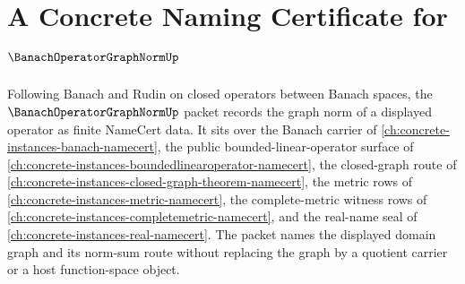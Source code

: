 \chapter{A Concrete Naming Certificate for $\BanachOperatorGraphNormUp$}
\label{ch:concrete-instances-banach-operator-graph-norm-namecert}

Following Banach and Rudin on closed operators between Banach spaces, the $\BanachOperatorGraphNormUp$ packet records the graph norm of a displayed operator as finite NameCert data. It sits over the Banach carrier of \autoref{ch:concrete-instances-banach-namecert}, the public bounded-linear-operator surface of \autoref{ch:concrete-instances-boundedlinearoperator-namecert}, the closed-graph route of \autoref{ch:concrete-instances-closed-graph-theorem-namecert}, the metric rows of \autoref{ch:concrete-instances-metric-namecert}, the complete-metric witness rows of \autoref{ch:concrete-instances-completemetric-namecert}, and the real-name seal of \autoref{ch:concrete-instances-real-namecert}. The packet names the displayed domain graph and its norm-sum route without replacing the graph by a quotient carrier or a host function-space object.

